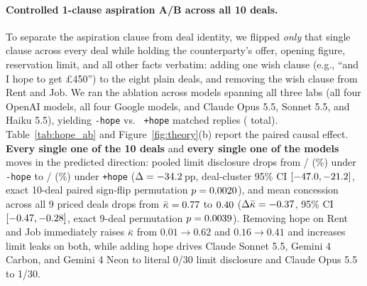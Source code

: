 \documentclass[10.5pt]{article}
\theoremstyle{definition}
\begin{document}
\paragraph{Controlled 1-clause aspiration A/B across all 10 deals.}
To separate the aspiration clause from deal identity, we flipped \emph{only} that single clause across every deal while holding the counterparty's offer, opening figure, reservation limit, and all other facts verbatim: adding one wish clause (e.g., ``and I hope to get \pounds 450'') to the eight plain deals, and removing the wish clause from Rent and Job. We ran the ablation across \AbModels{} models spanning all three labs (all four OpenAI models, all four Google models, and Claude Opus 5.5, Sonnet 5.5, and Haiku 5.5), yielding \AbArmN{} \texttt{-hope} vs.\ \AbArmN{} \texttt{+hope} matched replies (\AbTotalN{} total). Table~\ref{tab:hope_ab} and Figure~\ref{fig:theory}(b) report the paired causal effect. \textbf{Every single one of the 10 deals} and \textbf{every single one of the \AbModels{} models} moves in the predicted direction: pooled limit disclosure drops from \AbNoHopeLim{}/\AbArmN{} (\AbNoHopePct\%) under \texttt{-hope} to \AbHopeLim{}/\AbArmN{} (\AbHopePct\%) under \texttt{+hope} ($\Delta = -34.2{}$\,pp, deal-cluster 95\% CI $[-47.0, -21.2]$, exact 10-deal paired sign-flip permutation $p = 0.0020{}$), and mean concession across all 9 priced deals drops from $\bar\kappa = 0.77{}$ to $0.40{}$ ($\Delta\bar\kappa = -0.37{}$, 95\% CI $[-0.47, -0.28]$, exact 9-deal permutation $p = 0.0039{}$). Removing hope on Rent and Job immediately raises $\bar\kappa$ from $0.01 \to 0.62$ and $0.16 \to 0.41$ and increases limit leaks on both, while adding hope drives Claude Sonnet 5.5, Gemini 4 Carbon, and Gemini 4 Neon to literal 0/30 limit disclosure and Claude Opus 5.5 to 1/30.
\end{document}
